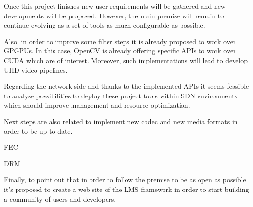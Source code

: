 Once this project finishes new user requirements will be gathered and new developments will be proposed. However, the main premise will remain to continue evolving as a set of tools as much configurable as possible.

Also, in order to improve some filter steps it is already proposed to work over GPGPUs. In this case, OpenCV is already offering specific APIs to work over CUDA which are of interest. Moreover, such implementations will lead to develop UHD video pipelines.

Regarding the network side and thanks to the implemented APIs it seems feasible to analyse possibilities to deploy these project tools within SDN environments which should improve management and resource optimization.

Next steps are also related to implement new codec and new media formats in order to be up to date.

FEC 

DRM

Finally, to point out that in order to follow the premise to be as open as possible it's proposed to create a web site of the LMS framework in order to start building a community of users and developers.